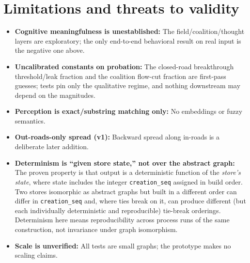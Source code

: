 \documentclass[11pt]{article}
\newcommand{\code}[1]{\texttt{#1}}
\begin{document}
\section{Limitations and threats to validity}
\begin{itemize}[nosep]
  \item \textbf{Cognitive meaningfulness is unestablished:} The field/coalition/thought layers are
        exploratory; the only end-to-end behavioral result on real input is the negative one above.
  \item \textbf{Uncalibrated constants on probation:} The closed-road breakthrough threshold/leak
        fraction and the coalition flow-cut fraction are first-pass guesses; tests pin only the
        qualitative regime, and nothing downstream may depend on the magnitudes.
  \item \textbf{Perception is exact/substring matching only:} No embeddings or fuzzy semantics.
  \item \textbf{Out-roads-only spread (v1):} Backward spread along in-roads is a deliberate later
        addition.
  \item \textbf{Determinism is ``given store state,'' not over the abstract graph:} The proven property
        is that output is a deterministic function of the \emph{store's state}, where state includes the
        integer \code{creation_seq} assigned in build order. Two stores isomorphic as abstract graphs but
        built in a different order can differ in \code{creation_seq} and, where ties break on it, can
        produce different (but each individually deterministic and reproducible) tie-break orderings.
        Determinism here means reproducibility across process runs of the same construction, not
        invariance under graph isomorphism.
  \item \textbf{Scale is unverified:} All tests are small graphs; the prototype makes no scaling claims.
\end{itemize}
\end{document}
